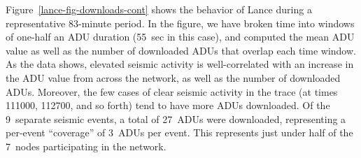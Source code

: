 Figure~\ref{lance-fig-downloads-cont} shows the behavior of Lance during a
representative 83-minute period. In the figure, we have broken time
into windows of one-half an ADU duration (55~sec in this case), and
computed the mean ADU value as well as the number of downloaded
ADUs that overlap each time window. As the data shows, elevated seismic
activity is well-correlated with an increase in the ADU value
from across the network, as well as the number of downloaded ADUs.
Moreover, the few cases of clear seismic activity in the trace 
(at times 111000, 112700, and so forth) tend to have more ADUs
downloaded. Of the 9~separate seismic events, a total of 27~ADUs were
downloaded, representing a per-event ``coverage'' of 3~ADUs per event.
This represents just under half of the 7~nodes participating in the network.





